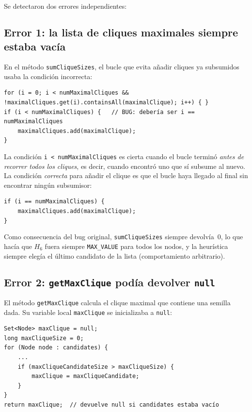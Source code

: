 \documentclass[11pt, a4paper]{article}
\begin{document}
Se detectaron dos errores independientes:

\subsection{Error 1: la lista de cliques maximales siempre estaba vacía}

En el método \texttt{sumCliqueSizes}, el bucle que evita añadir cliques ya subsumidos usaba la condición incorrecta:

\begin{lstlisting}[caption={Condición original (incorrecta)}]
for (i = 0; i < numMaximalCliques && !maximalCliques.get(i).containsAll(maximalClique); i++) { }
if (i < numMaximalCliques) {   // BUG: debería ser i == numMaximalCliques
    maximalCliques.add(maximalClique);
}
\end{lstlisting}

La condición \texttt{i < numMaximalCliques} es cierta cuando el bucle terminó \emph{antes de recorrer todos los cliques}, es decir, cuando encontró uno que sí subsume al nuevo. La condición \emph{correcta} para añadir el clique es que el bucle haya llegado al final sin encontrar ningún subsumisor:

\begin{lstlisting}[caption={Condición corregida}]
if (i == numMaximalCliques) {
    maximalCliques.add(maximalClique);
}
\end{lstlisting}

Como consecuencia del bug original, \texttt{sumCliqueSizes} siempre devolvía~0, lo que hacía que $H_6$ fuera siempre \texttt{MAX\_VALUE} para todos los nodos, y la heurística siempre elegía el último candidato de la lista (comportamiento arbitrario).

\subsection{Error 2: \texttt{getMaxClique} podía devolver \texttt{null}}

El método \texttt{getMaxClique} calcula el clique maximal que contiene una semilla dada. Su variable local \texttt{maxClique} se inicializaba a \texttt{null}:

\begin{lstlisting}[caption={Inicialización original (incorrecta)}]
Set<Node> maxClique = null;
long maxCliqueSize = 0;
for (Node node : candidates) {
    ...
    if (maxCliqueCandidateSize > maxCliqueSize) {
        maxClique = maxCliqueCandidate;
    }
}
return maxClique;  // devuelve null si candidates estaba vacío
\end{lstlisting}
\end{document}
